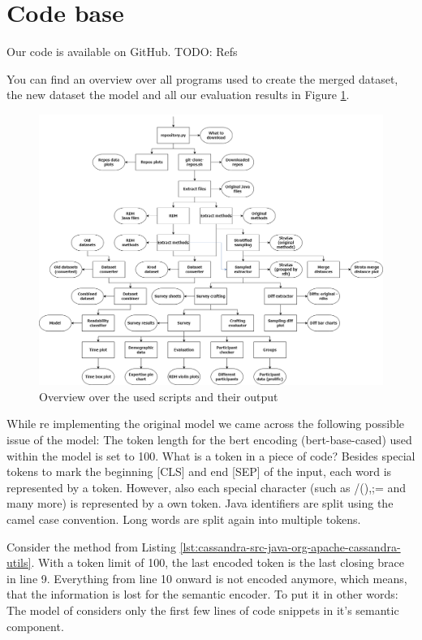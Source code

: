 \documentclass[%
class=scrreprt,
chapterprefix=false,%
open=right,%
twoside=false,%
paper=a4,%
logofile={Logo\_zentral\_farbig\_EN.png},%
thesistype=master,%
UKenglish,%
]{se2thesis}
\begin{document}
	
\section{Code base} \label{Code base}
	Our code is available on GitHub. TODO: Refs
	
	You can find an overview over all programs used to create the merged dataset, the new dataset the model and all our evaluation results in Figure \ref{fig:scripts_pipline}.
		
	\begin{figure}[t]
		\centering
		\includegraphics[width=\textwidth]{img/scripts_pipeline.png}
		\caption{Overview over the used scripts and their output}
		\label{fig:scripts_pipline}
	\end{figure}
	
	While re implementing the original model we came across the following possible issue of the model:
	The token length for the bert encoding (bert-base-cased) used within the model is set to 100. What is a token in a piece of code? Besides special tokens to mark the beginning [CLS] and end [SEP] of the input, each word is represented by a token. However, also each special character (such as /(){},;= and many more) is represented by a own token. Java identifiers are split using the camel case convention. Long words are split again into multiple tokens.
	
	Consider the method from Listing \ref{lst:cassandra-src-java-org-apache-cassandra-utils}. With a token limit of 100, the last encoded token is the last closing brace in line 9. Everything from line 10 onward is not encoded anymore, which means, that the information is lost for the semantic encoder. To put it in other words: The model of \citeauthor{mi2022towards} considers only the first few lines of code snippets in it's semantic component.
	
\end{document}

